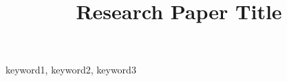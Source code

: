 \documentclass[conference]{lib/IEEEtran}
\begin{document}
\title{Research Paper Title}



\maketitle



\begin{IEEEkeywords}
keyword1, keyword2, keyword3
\end{IEEEkeywords}
















\balance


\end{document}
